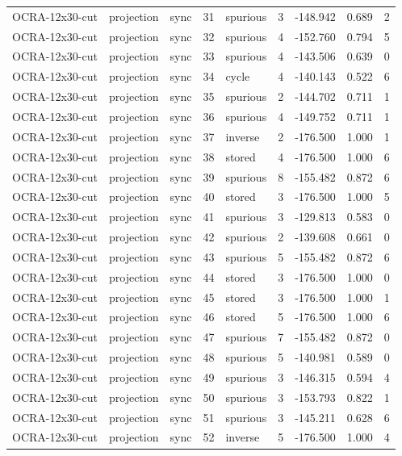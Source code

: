\begin{tabular}{lllrlrrrr}
OCRA-12x30-cut & projection & sync & 31 & spurious & 3 & -148.942 & 0.689 & 2 \\
OCRA-12x30-cut & projection & sync & 32 & spurious & 4 & -152.760 & 0.794 & 5 \\
OCRA-12x30-cut & projection & sync & 33 & spurious & 4 & -143.506 & 0.639 & 0 \\
OCRA-12x30-cut & projection & sync & 34 & cycle & 4 & -140.143 & 0.522 & 6 \\
OCRA-12x30-cut & projection & sync & 35 & spurious & 2 & -144.702 & 0.711 & 1 \\
OCRA-12x30-cut & projection & sync & 36 & spurious & 4 & -149.752 & 0.711 & 1 \\
OCRA-12x30-cut & projection & sync & 37 & inverse & 2 & -176.500 & 1.000 & 1 \\
OCRA-12x30-cut & projection & sync & 38 & stored & 4 & -176.500 & 1.000 & 6 \\
OCRA-12x30-cut & projection & sync & 39 & spurious & 8 & -155.482 & 0.872 & 6 \\
OCRA-12x30-cut & projection & sync & 40 & stored & 3 & -176.500 & 1.000 & 5 \\
OCRA-12x30-cut & projection & sync & 41 & spurious & 3 & -129.813 & 0.583 & 0 \\
OCRA-12x30-cut & projection & sync & 42 & spurious & 2 & -139.608 & 0.661 & 0 \\
OCRA-12x30-cut & projection & sync & 43 & spurious & 5 & -155.482 & 0.872 & 6 \\
OCRA-12x30-cut & projection & sync & 44 & stored & 3 & -176.500 & 1.000 & 0 \\
OCRA-12x30-cut & projection & sync & 45 & stored & 3 & -176.500 & 1.000 & 1 \\
OCRA-12x30-cut & projection & sync & 46 & stored & 5 & -176.500 & 1.000 & 6 \\
OCRA-12x30-cut & projection & sync & 47 & spurious & 7 & -155.482 & 0.872 & 0 \\
OCRA-12x30-cut & projection & sync & 48 & spurious & 5 & -140.981 & 0.589 & 0 \\
OCRA-12x30-cut & projection & sync & 49 & spurious & 3 & -146.315 & 0.594 & 4 \\
OCRA-12x30-cut & projection & sync & 50 & spurious & 3 & -153.793 & 0.822 & 1 \\
OCRA-12x30-cut & projection & sync & 51 & spurious & 3 & -145.211 & 0.628 & 6 \\
OCRA-12x30-cut & projection & sync & 52 & inverse & 5 & -176.500 & 1.000 & 4 \\

\end{tabular}
